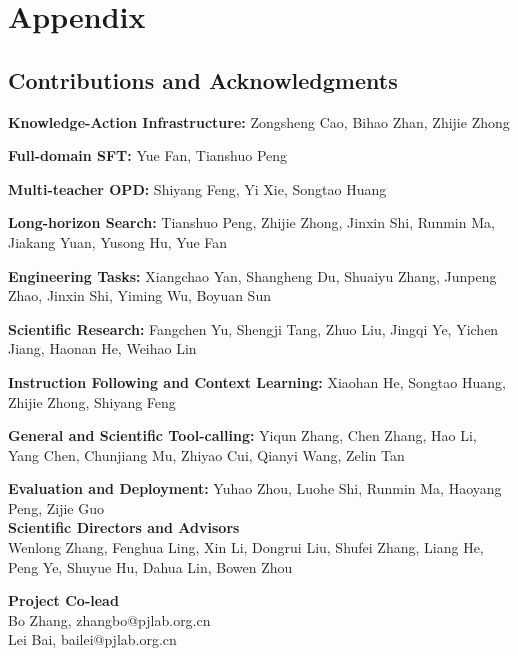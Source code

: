 \appendix
\section{Appendix}

\subsection{Contributions and Acknowledgments}


\noindent
\textbf{\color{damaired} Knowledge-Action Infrastructure:} Zongsheng Cao\footnotemark[2], Bihao Zhan, Zhijie Zhong

\noindent
\textbf{\color{damaired} Full-domain SFT:} Yue Fan\footnotemark[2], Tianshuo Peng

\noindent
\textbf{\color{damaired} Multi-teacher OPD:} Shiyang Feng\footnotemark[2], Yi Xie, Songtao Huang

\noindent
\textbf{\color{damaired} Long-horizon Search:} Tianshuo Peng\footnotemark[2], Zhijie Zhong, Jinxin Shi, Runmin Ma, Jiakang Yuan, Yusong Hu, Yue Fan

\noindent
\textbf{\color{damaired} Engineering Tasks:} Xiangchao Yan\footnotemark[2], Shangheng Du, Shuaiyu Zhang, Junpeng Zhao, Jinxin Shi, Yiming Wu, Boyuan Sun

\noindent
\textbf{\color{damaired} Scientific Research:} Fangchen Yu\footnotemark[2], Shengji Tang\footnotemark[2], Zhuo Liu, Jingqi Ye, Yichen Jiang, Haonan He, Weihao Lin

\noindent
\textbf{\color{damaired} Instruction Following and Context Learning:} Xiaohan He\footnotemark[2], Songtao Huang, Zhijie Zhong, Shiyang Feng

\noindent
\textbf{\color{damaired} General and Scientific Tool-calling:} Yiqun Zhang\footnotemark[2], Chen Zhang\footnotemark[2], Hao Li, Yang Chen, Chunjiang Mu, Zhiyao Cui, Qianyi Wang, Zelin Tan 

\noindent
\textbf{\color{damaired} Evaluation and Deployment:} Yuhao Zhou\footnotemark[2], Luohe Shi, Runmin Ma, Haoyang Peng, Zijie Guo \\

\noindent
\textbf{\color{damaired} Scientific Directors and Advisors} \\  [1.5mm]
Wenlong Zhang, Fenghua Ling, Xin Li, Dongrui Liu, Shufei Zhang, Liang He, Peng Ye, Shuyue Hu, Dahua Lin, Bowen Zhou

\noindent
\textbf{\color{damaired} Project Co-lead} \\ [1.5mm]
Bo Zhang, zhangbo@pjlab.org.cn \\
Lei Bai, bailei@pjlab.org.cn \\


